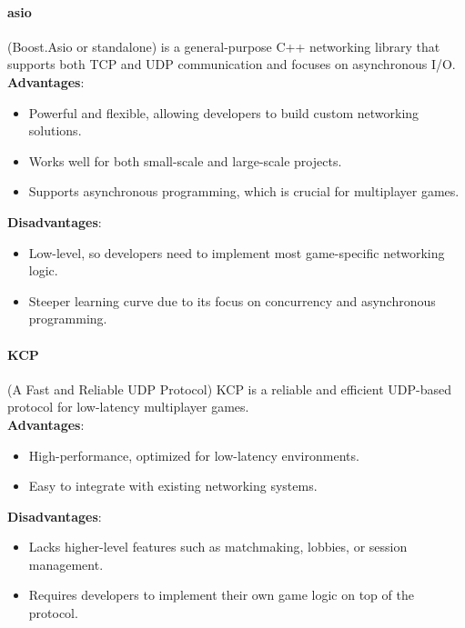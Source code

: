 \documentclass{article} %
\begin{document}
\paragraph{asio} (Boost.Asio or standalone) is a general-purpose C++ networking library that supports both TCP and UDP communication and focuses on asynchronous I/O.
\\
\textbf{Advantages}:
\begin{itemize}
	\item Powerful and flexible, allowing developers to build custom networking solutions.
	\item Works well for both small-scale and large-scale projects.
	\item Supports asynchronous programming, which is crucial for multiplayer games.
\end{itemize}
\textbf{Disadvantages}:
\begin{itemize}
	\item Low-level, so developers need to implement most game-specific networking logic.
	\item Steeper learning curve due to its focus on concurrency and asynchronous programming.
\end{itemize}

\paragraph{KCP} (A Fast and Reliable UDP Protocol) KCP is a reliable and efficient UDP-based protocol for low-latency multiplayer games.
\\
\textbf{Advantages}:
\begin{itemize}
	\item High-performance, optimized for low-latency environments.
	\item Easy to integrate with existing networking systems.
\end{itemize}
\textbf{Disadvantages}:
\begin{itemize}
	\item Lacks higher-level features such as matchmaking, lobbies, or session management.
	\item Requires developers to implement their own game logic on top of the protocol.
\end{itemize}
\end{document}

